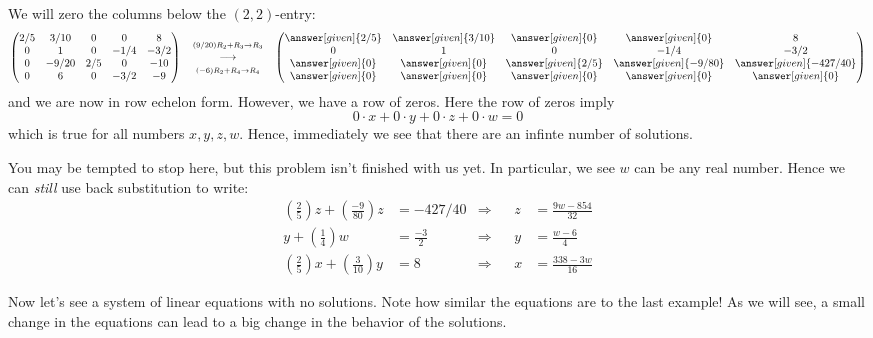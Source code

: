 \documentclass{ximera}
\begin{document}
\begin{example}
\begin{explanation}
We will zero the columns below the $(2,2)$-entry:
\[
  \begin{pmatrix}
    {2/5}&  {3/10} & {0} &{0} &8 \\
    {0}&  {1} & {0} &{-1/4} & -3/2\\
    {0}&  {-9/20} & {2/5} &{0} &-10\\
    {0}&  {6} & {0} &{-3/2} &-9
  \end{pmatrix}
  \quad
  \begin{matrix}
    \scriptstyle (9/20) R_2 + R_3\to R_3\\
    \longrightarrow \\
    \scriptstyle(-6) R_2+R_4\to R_4
  \end{matrix}
  \quad
  \begin{pmatrix}
    \answer[given]{2/5}&  \answer[given]{3/10} & \answer[given]{0} &\answer[given]{0} &8 \\
    {0}&  {1} & {0} &{-1/4} & -3/2\\
    \answer[given]{0}&  \answer[given]{0} & \answer[given]{2/5} &\answer[given]{-9/80} &\answer[given]{-427/40}\\
    \answer[given]{0}&  \answer[given]{0} & \answer[given]{0} &\answer[given]{0} &\answer[given]{0}
  \end{pmatrix}
\]
and we are now in row echelon form. However, we have a row of zeros.
Here the row of zeros imply
\[
0\cdot x+0\cdot y+0\cdot z+0\cdot w=0
\]
which is true for all numbers $x,y,z,w$. Hence, immediately we see
that there are an infinte number of solutions.

You may be tempted to stop here, but this problem isn't finished with
us yet. In particular, we see $w$ can be any real number. Hence we can
\textit{still} use back substitution to write:
\begin{align*}
 \left(\frac{2}{5}\right) z + \left(\frac{-9}{80}\right)z  &= -427/40   &\Rightarrow & & z &= \frac{9 w-854}{32} \\
  y+\left(\frac{1}{4}\right)w &=\frac{-3}{2} &\Rightarrow & & y &= \frac{w-6}{4}\\
  \left(\frac{2}{5}\right)x  +  \left(\frac{3}{10}\right)y  &= 8 &\Rightarrow & & x &= \frac{338-3w}{16}
\end{align*}
\end{explanation}
\end{example}

Now let's see a system of linear equations with no solutions. Note how similar the equations are to the last example! As we will see, a small change in the equations can lead to a big change in the behavior of the solutions.
\end{document}
